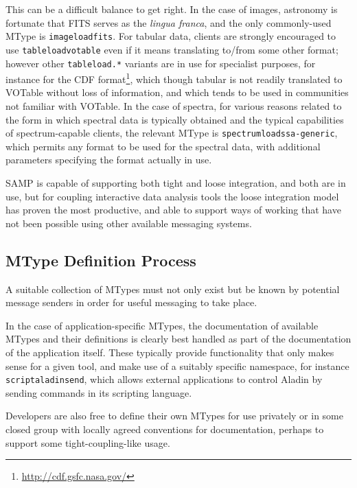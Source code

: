 \documentclass[5p]{elsarticle}
\begin{document}
This can be a difficult balance to get right.
In the case of images, astronomy is fortunate that FITS serves as
the {\em lingua franca\/}, and the only commonly-used MType is
{\tt image{\kdot}load{\kdot}fits}.
For tabular data, clients are strongly encouraged to use
{\tt table{\kdot}load{\kdot}votable} even if it means translating to/from
some other format;
however other {\tt table{\kdot}load.*} variants are in use
for specialist purposes,
for instance for the CDF format\footnote{\url{http://cdf.gsfc.nasa.gov/}},
which though tabular is
not readily translated to VOTable without loss of information,
and which tends to be used in communities not familiar with VOTable.
In the case of spectra, for various reasons related to the
form in which spectral data is typically obtained and
the typical capabilities of spectrum-capable clients,
the relevant MType is {\tt spectrum{\kdot}load{\kdot}ssa-generic},
which permits any format to be used for the spectral data,
with additional parameters specifying
the format actually in use.

SAMP is capable of supporting both tight and loose integration,
and both are in use,
but for coupling interactive data analysis tools the loose integration
model has proven the most productive,
and able to support ways of working that have not been possible
using other available messaging systems.

\subsection{MType Definition Process} \label{sec:mtypeProcess}

A suitable collection of MTypes must not only exist but be known by
potential message senders in order for useful messaging to take place.

In the case of application-specific MTypes, the documentation of
available MTypes and their definitions is clearly
best handled as part of the documentation of the application itself.
These typically provide functionality that only makes sense for
a given tool, and make use of a suitably specific namespace,
for instance {\tt script{\kdot}aladin{\kdot}send},
which allows external applications to control Aladin
\citep{2000A&AS..143...33B} by sending commands in its scripting language.

Developers are also free to define their own MTypes for use privately
or in some closed group with locally agreed conventions for documentation,
perhaps to support some tight-coupling-like usage.
\end{document}
